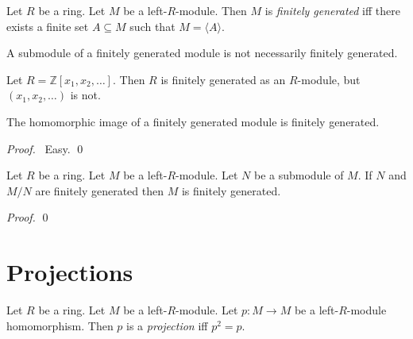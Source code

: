 \begin{df}
Let $R$ be a ring. Let $M$ be a left-$R$-module. Then $M$ is \emph{finitely generated} iff there exists a finite set $A \subseteq M$ such that $M = \langle A \rangle$.
\end{df}

\begin{ex}
A submodule of a finitely generated module is not necessarily finitely generated.

Let $R = \mathbb{Z}[x_1, x_2, \ldots]$. Then $R$ is finitely generated as an $R$-module, but $(x_1, x_2, \ldots)$ is not.
\end{ex}

\begin{prop}
The homomorphic image of a finitely generated module is finitely generated.
\end{prop}

\begin{proof}
\pf\ Easy.  \qed
\end{proof}

\begin{prop}
Let $R$ be a ring. Let $M$ be a left-$R$-module. Let $N$ be a submodule of $M$. If $N$ and $M/N$ are finitely generated then $M$ is finitely generated.
\end{prop}

\begin{proof}
\pf
{}
\qed
\end{proof}

\section{Projections}

\begin{df}[Projection]
Let $R$ be a ring. Let $M$ be a left-$R$-module. Let $p : M \rightarrow M$ be a left-$R$-module homomorphism. Then $p$ is a \emph{projection} iff $p^2 = p$.
\end{df}

